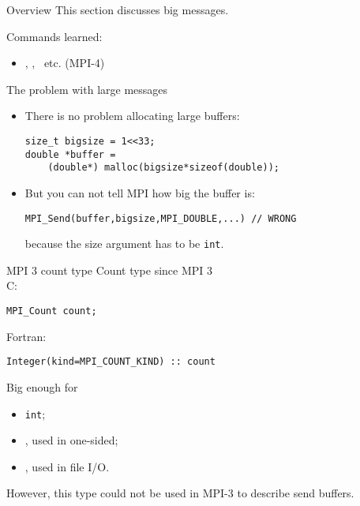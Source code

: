 
\begin{numberedframe}{Overview}
  This section discusses big messages.

  Commands learned:
  \begin{itemize}
  \item {}, ,
    ~etc. (MPI-4)
  \end{itemize}
\end{numberedframe}

\begin{numberedframe}{The problem with large messages}
  \begin{itemize}
  \item There is no problem allocating large buffers:
\begin{lstlisting}
size_t bigsize = 1<<33;
double *buffer =
    (double*) malloc(bigsize*sizeof(double));
\end{lstlisting}
\item But you can not tell MPI how big the buffer is:
\begin{lstlisting}
MPI_Send(buffer,bigsize,MPI_DOUBLE,...) // WRONG
\end{lstlisting}
because the size argument has to be \lstinline{int}.
  \end{itemize}
\end{numberedframe}

\begin{numberedframe}{MPI 3 count type}
  Count type since MPI 3\\
  C:
\begin{lstlisting}
MPI_Count count;
\end{lstlisting}
Fortran:
\lstset{language=Fortran}
\begin{lstlisting}
Integer(kind=MPI_COUNT_KIND) :: count
\end{lstlisting}
\lstset{language=C}
Big enough for
\begin{itemize}
\item
  \lstinline{int};
\item {}, used in one-sided;
\item {}, used in file I/O.
\end{itemize}
However, this type could not be used in MPI-3 to describe send buffers.
\end{numberedframe}

